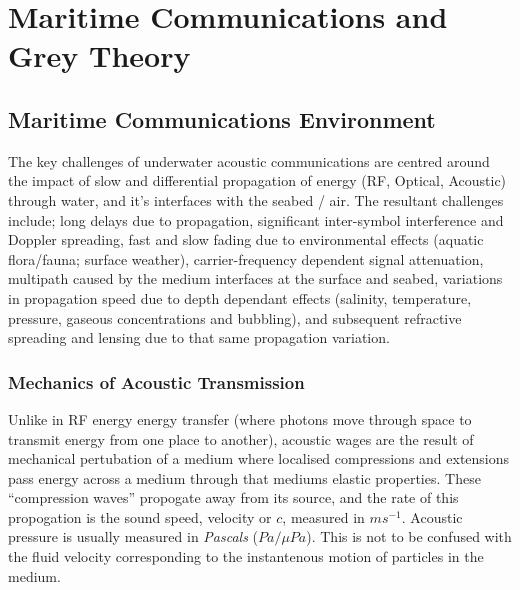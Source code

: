 \def\ChapterTitle{Maritime Communications and Grey Theory}

\ifx\ifthesis\undefined

\else
\chapter{\ChapterTitle}
\label{Chapter\thechapter}
\fi


\section{Maritime Communications Environment}\label{sec:trust_in_marine}

The key challenges of underwater acoustic communications are centred around the impact of slow and differential propagation of energy (RF, Optical, Acoustic) through water, and it's interfaces with the seabed / air.
The resultant challenges include; long delays due to propagation, significant inter-symbol interference and Doppler spreading, fast and slow fading due to environmental effects (aquatic flora/fauna; surface weather), carrier-frequency dependent signal attenuation, multipath caused by the medium interfaces at the surface and seabed, variations in propagation speed due to depth dependant effects (salinity, temperature, pressure, gaseous concentrations and bubbling), and subsequent refractive spreading and lensing due to that same propagation variation\cite{Partan2006}.

\subsection{Mechanics of Acoustic Transmission}

Unlike in RF energy energy transfer (where photons move through space to transmit energy from one place to another), acoustic wages are the result of mechanical pertubation of a medium where localised compressions and extensions pass energy across a medium through that mediums elastic properties.
These ``compression waves'' propogate away from its source, and the rate of this propogation is the sound speed, velocity or $c$, measured in $ms^{-1}$.
Acoustic pressure is usually measured in \emph{Pascals} ($Pa/\mu Pa$). 
This is not to be confused with the fluid velocity corresponding to the instantenous motion of particles in the medium.

